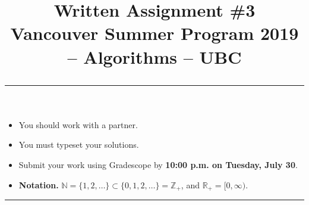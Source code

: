 \documentclass[11pt]{article}
\title{
  Written Assignment \#3 \\[0.5em]
  \large
  Vancouver Summer Program 2019 -- Algorithms -- UBC \\
  \vspace*{0.2in} \hrule
}
\date{}
\newcommand{\R}{\mathbb{R}}
\newcommand{\Z}{\mathbb{Z}}
\newcommand{\N}{\mathbb{N}}
\begin{document}
\maketitle

\setlength{\baselineskip}{0.90\baselineskip}




\pagestyle{empty}

\vspace*{-0.75in}


\begin{itemize}
\item You should work with a partner.
\item You must typeset your solutions.
\item Submit your work using Gradescope by {\bf 10:00 p.m. on Tuesday, July 30}.
\item \textbf{Notation.} $\N = \{1,2,\dotsc\} \subset \{0,1,2,\dotsc\} = \Z_{+}$, and $\R_{+} = [0,\infty)$.
\end{itemize}

\hrule
\end{document}
